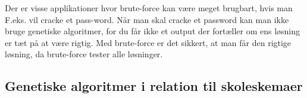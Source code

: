 Der er visse applikationer hvor brute-force kan være meget brugbart, hvis man F.eks. vil cracke et pass-word. Når man skal cracke et password kan man ikke bruge genetiske algoritmer, for du får ikke et output der fortæller om ens løsning er tæt på at være rigtig. Med brute-force er det sikkert, at man får den rigtige løsning, da brute-force tester alle løsninger.


\subsection{Genetiske algoritmer i relation til skoleskemaer}
  